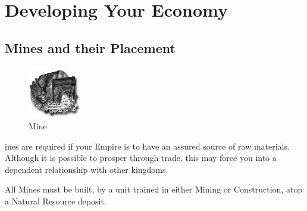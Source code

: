 
\chapter{Developing Your Economy}


\section{Mines and their Placement}


\begin{figure}
	\vspace{-20pt}
	\begin{center}
		\includegraphics[width=0.2\textwidth]{Imine}
		\\ Mine
	\end{center}
	\vspace{-20pt} %
\end{figure}

ines are required if your Empire is to have an assured source of raw materials. Although it is possible to prosper through trade, this may force you into a dependent relationship with other kingdoms.

All Mines must be built, by a unit trained in either Mining or Construction, atop a Natural Resource deposit. \\

